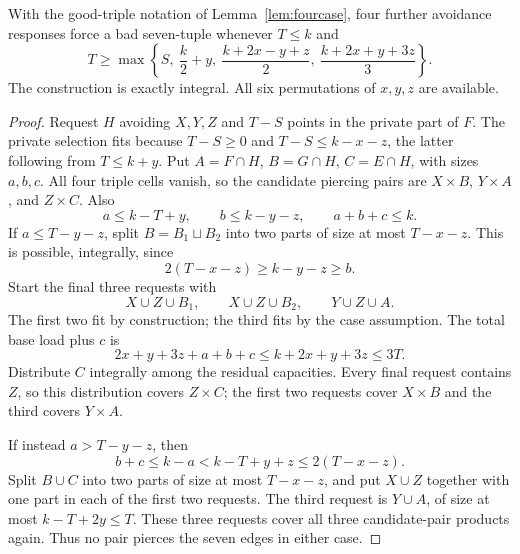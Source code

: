 \begin{lemma}\label{lem:asymone}
With the good-triple notation of Lemma~\ref{lem:fourcase}, four further avoidance responses force a bad seven-tuple whenever $T\le k$ and
\[
T\ge\max\left\{S,\ \frac k2+y,\ \frac{k+2x-y+z}{2},\ \frac{k+2x+y+3z}{3}\right\}.
\]
The construction is exactly integral. All six permutations of $x,y,z$ are available.
\end{lemma}
\begin{proof}
Request $H$ avoiding $X,Y,Z$ and $T-S$ points in the private part of $F$. The private selection fits because $T-S\ge0$ and $T-S\le k-x-z$, the latter following from $T\le k+y$. Put $A=F\cap H$, $B=G\cap H$, $C=E\cap H$, with sizes $a,b,c$. All four triple cells vanish, so the candidate piercing pairs are $X\times B$, $Y\times A$, and $Z\times C$. Also
\[
a\le k-T+y,\qquad b\le k-y-z,\qquad a+b+c\le k.
\]
If $a\le T-y-z$, split $B=B_1\sqcup B_2$ into two parts of size at most $T-x-z$. This is possible, integrally, since
\[
2(T-x-z)\ge k-y-z\ge b.
\]
Start the final three requests with
\[
X\cup Z\cup B_1,\qquad X\cup Z\cup B_2,\qquad Y\cup Z\cup A.
\]
The first two fit by construction; the third fits by the case assumption. The total base load plus $c$ is
\[
2x+y+3z+a+b+c\le k+2x+y+3z\le3T.
\]
Distribute $C$ integrally among the residual capacities. Every final request contains $Z$, so this distribution covers $Z\times C$; the first two requests cover $X\times B$ and the third covers $Y\times A$.

If instead $a>T-y-z$, then
\[
b+c\le k-a<k-T+y+z\le2(T-x-z).
\]
Split $B\cup C$ into two parts of size at most $T-x-z$, and put $X\cup Z$ together with one part in each of the first two requests. The third request is $Y\cup A$, of size at most $k-T+2y\le T$. These three requests cover all three candidate-pair products again. Thus no pair pierces the seven edges in either case.
\end{proof}

